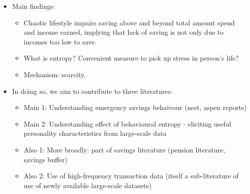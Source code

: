 \begin{itemize}
    \item Main findings:

        \begin{itemize}
            \item Chaotic lifestyle impairs saving above and beyond total
                amount spend and income earned, implying that lack of saving is
                not only due to incomes too low to save.

            \item What is entropy? Convenient measure to pick up stress in
                person's life?

            \item Mechanism: scarcity.

        \end{itemize}

    \item In doing so, we aim to contribute to three literatures:

    \begin{itemize}
        \item Main 1: Understanding emergency savings behaivour (nest, aspen reports)

        \item Main 2: Understanding effect of behavioural entropy - eliciting
            useful personality characteristics from large-scale data

        \item Also 1: More broadly: part of savings literature (pension literature,
            savings buffer)

        \item Also 2: Use of high-frequency transaction data (itself a sub-literature of
            use of newly available large-scale datasets)
    \end{itemize}
\end{itemize}






